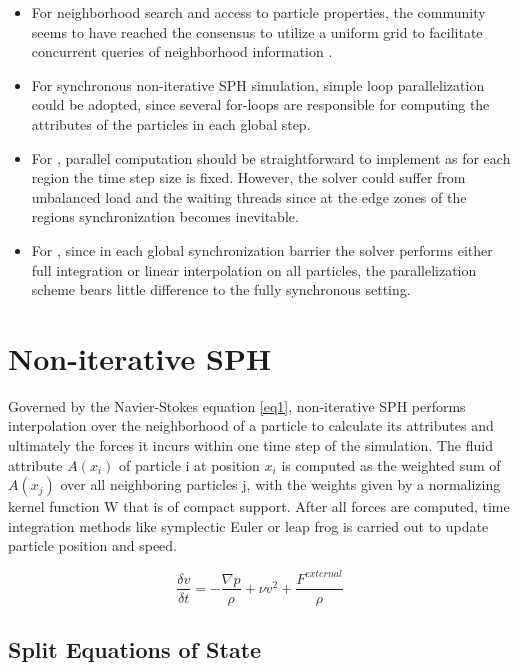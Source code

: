 \documentclass[
	11pt, 
	DIV10,
	ngerman,
	a4paper, 
	oneside, 
	headings=normal, 
	captions=tableheading,
	final, 
	numbers=noenddot
]{scrartcl}
\begin{document}
\begin{itemize}
    \item For neighborhood search and access to particle properties, the community seems to have reached the consensus to utilize a uniform grid to facilitate concurrent queries of neighborhood information \cite{ihmsen2014sph}.
    \item For synchronous non-iterative SPH simulation, simple loop parallelization could be adopted, since several for-loops are responsible for computing the attributes of the particles in each global step.
    \item For \cite{goswami2014regional}, parallel computation should be straightforward to implement as for each region the time step size is fixed. However, the solver could suffer from unbalanced load and the waiting threads since at the edge zones of the regions synchronization becomes inevitable.
    \item For \cite{ban2018adaptively}, since in each global synchronization barrier the solver performs either full integration or linear interpolation on all particles, the parallelization scheme bears little difference to the fully synchronous setting.
\end{itemize}

\section{Non-iterative SPH}

Governed by the Navier-Stokes equation \ref{eq1}, non-iterative SPH performs interpolation over the neighborhood of a particle to calculate its attributes and ultimately the forces it incurs within one time step of the simulation. The fluid attribute $ A(x_{i}) $ of particle i at position $ x_{i} $ is computed as the weighted sum of  $ A(x_{j}) $ over all neighboring particles j, with the weights given by a normalizing kernel function W that is of compact support. After all forces are computed, time integration methods like symplectic Euler or leap frog is carried out to update particle position and speed.

\begin{equation}
	\label{eq1}
	\frac{\delta v}{\delta t} = -\frac{\nabla p}{\rho} + \nu v^{2} + \frac{F^{external}}{\rho}
\end{equation}

\subsection{Split Equations of State}
\end{document}
